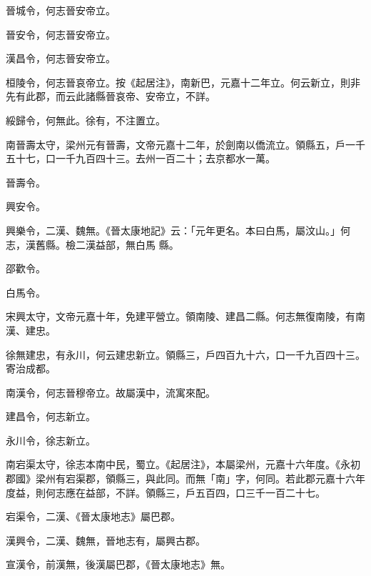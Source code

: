 \begin{pinyinscope}
 晉城令，何志晉安帝立。



 晉安令，何志晉安帝立。



 漢昌令，何志晉安帝立。



 桓陵令，何志晉哀帝立。按《起居注》，南新巴，元嘉十二年立。何云新立，則非先有此郡，而云此諸縣晉哀帝、安帝立，不詳。



 綏歸令，何無此。徐有，不注置立。



 南晉壽太守，梁州元有晉壽，文帝元嘉十二年，於劍南以僑流立。領縣五，戶一千五十七，口一千九百四十三。去州一百二十；去京都水一萬。


晉壽令。


興安令。



 興樂令，二漢、魏無。《晉太康地記》云：「元年更名。本曰白馬，屬汶山。」何志，漢舊縣。檢二漢益部，無白馬
 縣。


邵歡令。


白馬令。



 宋興太守，文帝元嘉十年，免建平營立。領南陵、建昌二縣。何志無復南陵，有南漢、建忠。



 徐無建忠，有永川，何云建忠新立。領縣三，戶四百九十六，口一千九百四十三。寄治成都。



 南漢令，何志晉穆帝立。故屬漢中，流寓來配。



 建昌令，何志新立。



 永川令，徐志新立。



 南宕渠太守，徐志本南中民，蜀立。《起居注》，本屬梁州，元嘉十六年度。《永初郡國》梁州有宕渠郡，領縣三，與此同。而無「南」字，何同。若此郡元嘉十六年度益，則何志應在益部，不詳。領縣三，戶五百四，口三千一百二十七。



 宕渠令，二漢、《晉太康地志》屬巴郡。



 漢興令，二漢、魏無，晉地志有，屬興古郡。



 宣漢令，前漢無，後漢屬巴郡，《晉太康地志》無。



\end{pinyinscope}

